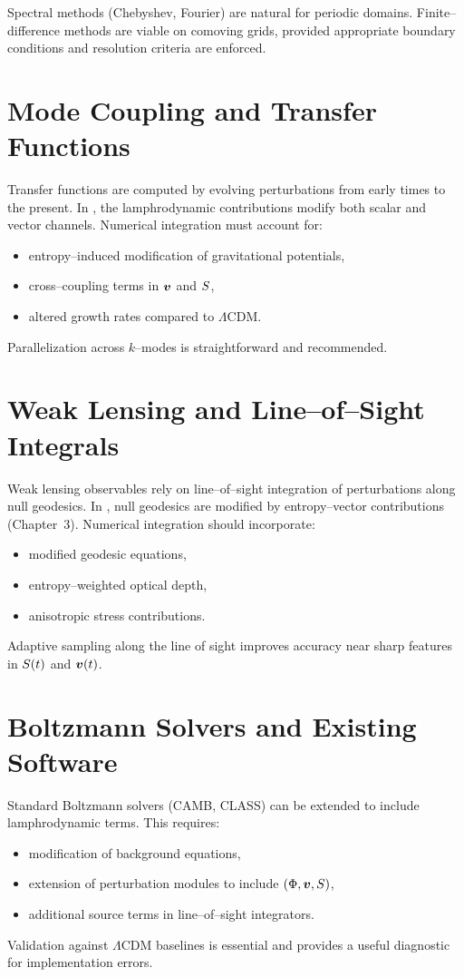 Spectral methods (Chebyshev, Fourier) are natural for periodic domains.
Finite--difference methods are viable on comoving grids, provided
appropriate boundary conditions and resolution criteria are enforced.

\section{Mode Coupling and Transfer Functions}

Transfer functions are computed by evolving perturbations from early
times to the present.  In \rsvpabbr{}, the lamphrodynamic contributions
modify both scalar and vector channels.  Numerical integration must
account for:
\begin{itemize}
  \item entropy--induced modification of gravitational potentials,
  \item cross--coupling terms in $\bm{v}$ and $S$,
  \item altered growth rates compared to $\Lambda$CDM.
\end{itemize}
Parallelization across $k$--modes is straightforward and recommended.

\section{Weak Lensing and Line--of--Sight Integrals}

Weak lensing observables rely on line--of--sight integration of
perturbations along null geodesics.  In \rsvpabbr{}, null geodesics are
modified by entropy--vector contributions (Chapter~3).  Numerical
integration should incorporate:
\begin{itemize}
  \item modified geodesic equations,
  \item entropy--weighted optical depth,
  \item anisotropic stress contributions.
\end{itemize}
Adaptive sampling along the line of sight improves accuracy near sharp
features in $S(t)$ and $\bm{v}(t)$.

\section{Boltzmann Solvers and Existing Software}

Standard Boltzmann solvers (CAMB, CLASS) can be extended to include
lamphrodynamic terms.  This requires:
\begin{itemize}
  \item modification of background equations,
  \item extension of perturbation modules to include $(\Phi,\bm{v},S)$,
  \item additional source terms in line--of--sight integrators.
\end{itemize}
Validation against $\Lambda$CDM baselines is essential and provides a
useful diagnostic for implementation errors.

